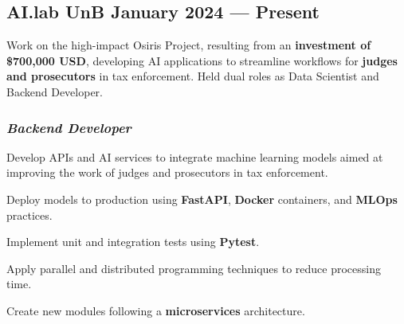 \documentclass[a4paper,12pt]{article}
\begin{document}

\subsection*{\large AI.lab UnB \hfill January 2024 --- Present}

Work on the high-impact Osiris Project, resulting from an \textbf{investment of \$700,000 USD}, developing AI applications to streamline workflows for \textbf{judges and prosecutors} in tax enforcement. Held dual roles as Data Scientist and Backend Developer.

\vspace{0.5em}

\vspace{1em}

\subsubsection*{\small \textit{Backend Developer}}
\vspace{-1em}
\vspace{-0.5em}
\begin{zitemize}
    \item Develop APIs and AI services to integrate machine learning models aimed at improving the work of judges and prosecutors in tax enforcement.
    \item Deploy models to production using \textbf{FastAPI}, \textbf{Docker} containers, and \textbf{MLOps} practices.
    \item Implement unit and integration tests using \textbf{Pytest}.
    \item Apply parallel and distributed programming techniques to reduce processing time.
    \item Create new modules following a \textbf{microservices} architecture.
\end{zitemize}
\end{document}
